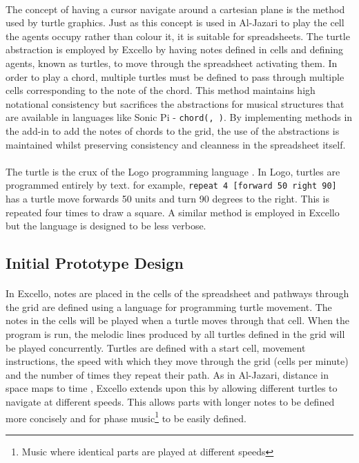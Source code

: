 \paragraph{} The concept of having a cursor navigate around a cartesian plane is the method used by turtle graphics. Just as this concept is used in Al-Jazari to play the cell the agents occupy rather than colour it, it is suitable for spreadsheets. The turtle abstraction is employed by Excello by having notes defined in cells and defining agents, known as turtles, to move through the spreadsheet activating them. In order to play a chord, multiple turtles must be defined to pass through multiple cells corresponding to the note of the chord. This method maintains high notational consistency but sacrifices the abstractions for musical structures that are available in languages like Sonic Pi - \texttt{chord(, )}. By implementing methods in the add-in to add the notes of chords to the grid, the use of the abstractions is maintained whilst preserving consistency and cleanness in the spreadsheet itself.

\paragraph{} The turtle is the crux of the Logo programming language \cite{goldman:turtle}. In Logo, turtles are programmed entirely by text. for example, \texttt{repeat 4 [forward 50 right 90]} has a turtle move forwards 50 units and turn 90 degrees to the right. This is repeated four times to draw a square. A similar method is employed in Excello but the language is designed to be less verbose.

\subsection{Initial Prototype Design}

\paragraph{} In Excello, notes are placed in the cells of the spreadsheet and pathways through the grid are defined using a language for programming turtle movement. The notes in the cells will be played when a turtle moves through that cell. When the program is run, the melodic lines produced by all turtles defined in the grid will be played concurrently. Turtles are defined with a start cell, movement instructions, the speed with which they move through the grid (cells per minute) and the number of times they repeat their path. As in Al-Jazari, distance in space maps to time \cite{mclean:texture}, Excello extends upon this by allowing different turtles to navigate at different speeds. This allows parts with longer notes to be defined more concisely and for phase music\footnote{Music where identical parts are played at different speeds} to be easily defined.

